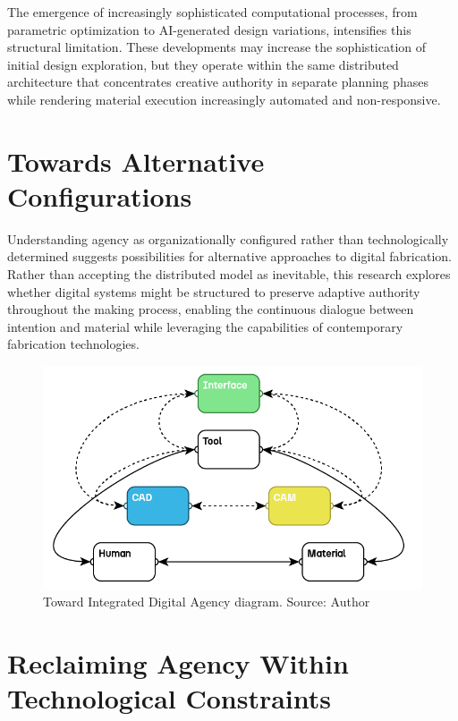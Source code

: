 The emergence of increasingly sophisticated computational processes, from parametric optimization to AI-generated design variations, intensifies this structural limitation. These developments may increase the sophistication of initial design exploration, but they operate within the same distributed architecture that concentrates creative authority in separate planning phases while rendering material execution increasingly automated and non-responsive.

\section{Towards Alternative Configurations}

Understanding agency as organizationally configured rather than technologically determined suggests possibilities for alternative approaches to digital fabrication. Rather than accepting the distributed model as inevitable, this research explores whether digital systems might be structured to preserve adaptive authority throughout the making process, enabling the continuous dialogue between intention and material while leveraging the capabilities of contemporary fabrication technologies.

\begin{figure}[h]
\centering
\includegraphics[width=1\textwidth]{figures/chapter1/Integrated Digital Agency.png}
\caption{Toward Integrated Digital Agency diagram. Source: Author}
\label{fig:integrated_digital_agency}
\end{figure}

\section{Reclaiming Agency Within Technological Constraints}

